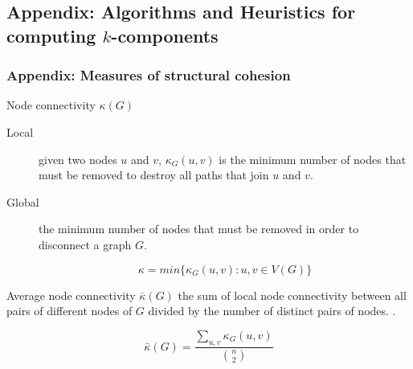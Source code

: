 \documentclass[ignorenonframetext,red,8pt,notes=hide]{beamer}
\begin{document}
\subsection*{Appendix: Algorithms and Heuristics for computing $k$-components}

\begin{frame}
\frametitle{Appendix: Measures of structural cohesion}

\begin{block}{Node connectivity $\kappa(G)$}
\begin{description}
\item[Local] given two nodes $u$ and $v$, $\kappa_{G}(u,v)$ is the minimum number of nodes that must be removed to destroy all paths that join $u$ and $v$.

\item[Global] the minimum number of nodes that must be removed in order to disconnect a graph $G$.

\begin{equation*}
\kappa = min{\{\kappa_{G}(u,v):u,v \in V(G)\}}
\end{equation*}

\end{description}

\end{block}

\begin{block}{Average node connectivity $\bar{\kappa}(G)$}
the sum of local node connectivity between all pairs of different nodes of $G$ divided by the number of distinct pairs of nodes. \citep*{beineke:2002}.

\begin{equation*}
\bar{\kappa}(G) = \frac{\sum_{u,v} \kappa_{G}(u,v)}{{n \choose 2}}
\end{equation*}
\end{block}

\end{frame}
\end{document}
